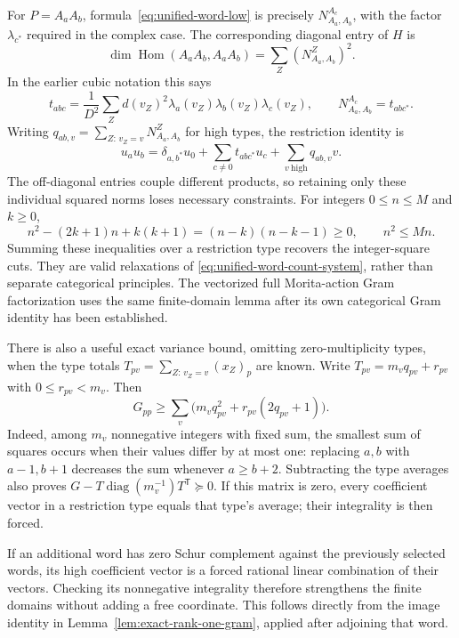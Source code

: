 For $P=A_aA_b$, formula~\eqref{eq:unified-word-low} is precisely
$N_{A_a,A_b}^{A_c}$, with the factor $\lambda_{c^*}$ required in the
complex case. The corresponding diagonal entry of $H$ is
\begin{equation}\label{eq:r4-fourth-moment}
 \dim\operatorname{Hom}(A_aA_b,A_aA_b)
   =\sum_Z (N_{A_a,A_b}^{Z})^2.
\end{equation}
In the earlier cubic notation this says
\begin{equation}\label{eq:r4-complex-triple}
 t_{abc}=\frac1{D^2}\sum_Z d(v_Z)^2
       \lambda_a(v_Z)\lambda_b(v_Z)\lambda_c(v_Z),
 \qquad N_{A_a,A_b}^{A_c}=t_{ab c^*}.
\end{equation}
Writing $q_{ab,v}=\sum_{Z:\,v_Z=v}N_{A_a,A_b}^{Z}$ for high types,
the restriction identity is
\begin{equation}\label{eq:r4-complex-restriction}
 u_a u_b=\delta_{a,b^*}u_0+
       \sum_{c\ne0}t_{ab c^*}u_c+\sum_{v\ \mathrm{high}}q_{ab,v}v.
\end{equation}
The off-diagonal entries couple different products, so retaining only
these individual squared norms loses necessary constraints.
For integers $0\le n\le M$ and $k\ge0$,
\[
 n^2-(2k+1)n+k(k+1)=(n-k)(n-k-1)\ge0,
 \qquad n^2\le Mn.
\]
Summing these inequalities over a restriction type recovers the
integer-square cuts. They are valid relaxations of
\eqref{eq:unified-word-count-system}, rather than separate categorical
principles. The vectorized full Morita-action Gram factorization uses
the same finite-domain lemma after its own categorical Gram identity
has been established.

There is also a useful exact variance bound, omitting zero-multiplicity
types, when the type totals
$T_{pv}=\sum_{Z:\,v_Z=v}(x_Z)_p$ are known. Write
$T_{pv}=m_vq_{pv}+r_{pv}$ with $0\le r_{pv}<m_v$. Then
\begin{equation}\label{eq:integral-variance-bound}
 G_{pp}\ge\sum_v
       \bigl(m_vq_{pv}^2+r_{pv}(2q_{pv}+1)\bigr).
\end{equation}
Indeed, among $m_v$ nonnegative integers with fixed sum, the smallest
sum of squares occurs when their values differ by at most one: replacing
$a,b$ with $a-1,b+1$ decreases the sum whenever $a\ge b+2$.
Subtracting the type averages also proves
$G-T\operatorname{diag}(m_v^{-1})T^{\mathsf T}\succeq0$.
If this matrix is zero, every coefficient vector in a restriction type
equals that type's average; their integrality is then forced.

If an additional word has zero Schur complement against the previously
selected words, its high coefficient vector is a forced rational linear
combination of their vectors. Checking its nonnegative integrality
therefore strengthens the finite domains without adding a free coordinate.
This follows directly from the image identity in
Lemma~\ref{lem:exact-rank-one-gram}, applied after adjoining that word.

